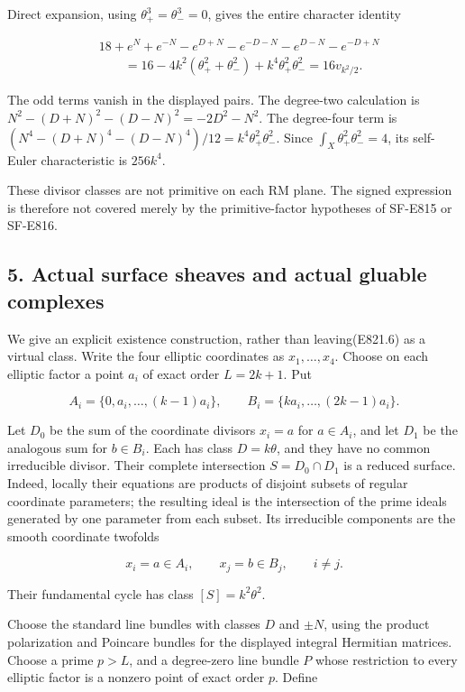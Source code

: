 Direct expansion, using \(\theta_+^3=\theta_-^3=0\), gives the entire
character identity

\[
 \begin{split}
 &18+e^N+e^{-N}
       -e^{D+N}-e^{-D-N}-e^{D-N}-e^{-D+N}\\
 &\qquad=16-4k^2(\theta_+^2+\theta_-^2)
                 +k^4\theta_+^2\theta_-^2
       =16v_{k^2/2}.
 \end{split}
 \tag{E821.6}
\]

The odd terms vanish in the displayed pairs. The degree-two calculation
is \(N^2-(D+N)^2-(D-N)^2=-2D^2-N^2\). The degree-four term is
\((N^4-(D+N)^4-(D-N)^4)/12=k^4\theta_+^2\theta_-^2\). Since
\(\int_X\theta_+^2\theta_-^2=4\), its self-Euler characteristic is
\(256k^4\).

These divisor classes are not primitive on each RM plane. The signed
expression is therefore not covered merely by the primitive-factor
hypotheses of SF-E815 or SF-E816.

\subsection{5. Actual surface sheaves and actual gluable
complexes}\label{SF-E821-actual-surface-sheaves-and-actual-gluable-complexes}

We give an explicit existence construction, rather than leaving(E821.6)
as a virtual class. Write the four elliptic coordinates as
\(x_1,\ldots,x_4\). Choose on each elliptic factor a point \(a_i\) of
exact order \(L=2k+1\). Put

\[
 A_i=\{0,a_i,\ldots,(k-1)a_i\},
 \qquad
 B_i=\{ka_i,\ldots,(2k-1)a_i\}.
\]

Let \(D_0\) be the sum of the coordinate divisors \(x_i=a\) for
\(a\in A_i\), and let \(D_1\) be the analogous sum for \(b\in B_i\).
Each has class \(D=k\theta\), and they have no common irreducible
divisor. Their complete intersection \(S=D_0\cap D_1\) is a reduced
surface. Indeed, locally their equations are products of disjoint
subsets of regular coordinate parameters; the resulting ideal is the
intersection of the prime ideals generated by one parameter from each
subset. Its irreducible components are the smooth coordinate twofolds

\[
 x_i=a\in A_i,\qquad x_j=b\in B_j,\qquad i\ne j.
\]

Their fundamental cycle has class \([S]=k^2\theta^2\).

Choose the standard line bundles with classes \(D\) and \(\pm N\), using
the product polarization and Poincare bundles for the displayed integral
Hermitian matrices. Choose a prime \(p>L\), and a degree-zero line
bundle \(P\) whose restriction to every elliptic factor is a nonzero
point of exact order \(p\). Define

